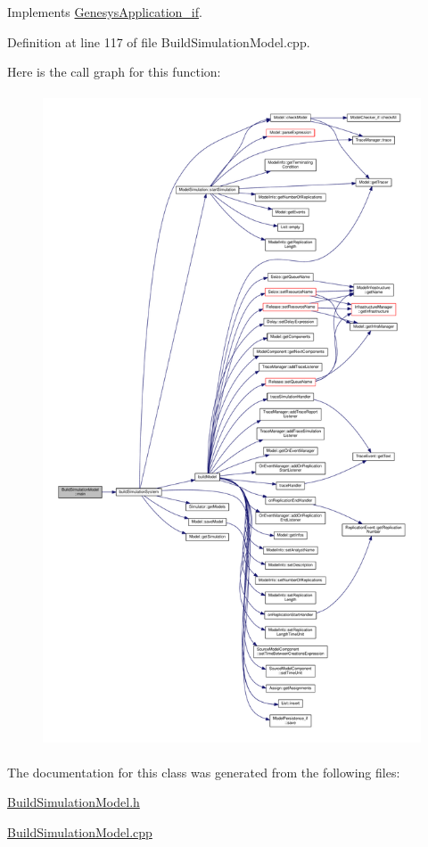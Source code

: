 Implements \hyperlink{class_genesys_application__if_a2b07e7803b410a4a8d0f87422dabb004}{Genesys\-Application\-\_\-if}.



Definition at line 117 of file Build\-Simulation\-Model.\-cpp.



Here is the call graph for this function\-:
\nopagebreak
\begin{figure}[H]
\begin{center}
\leavevmode
\includegraphics[height=550pt]{class_build_simulation_model_a8c50f55d7293860e5e7bc7e7e74f8d4a_cgraph}
\end{center}
\end{figure}




The documentation for this class was generated from the following files\-:\begin{DoxyCompactItemize}
\item 
\hyperlink{_build_simulation_model_8h}{Build\-Simulation\-Model.\-h}\item 
\hyperlink{_build_simulation_model_8cpp}{Build\-Simulation\-Model.\-cpp}\end{DoxyCompactItemize}
